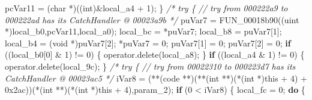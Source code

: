 \documentclass[
]{article}
\newenvironment{Shaded}{}{}
\newcommand{\BaseNTok}[1]{\textcolor[rgb]{0.25,0.63,0.44}{#1}}
\newcommand{\CommentTok}[1]{\textcolor[rgb]{0.38,0.63,0.69}{\textit{#1}}}
\newcommand{\ControlFlowTok}[1]{\textcolor[rgb]{0.00,0.44,0.13}{\textbf{#1}}}
\newcommand{\DataTypeTok}[1]{\textcolor[rgb]{0.56,0.13,0.00}{#1}}
\newcommand{\DecValTok}[1]{\textcolor[rgb]{0.25,0.63,0.44}{#1}}
\newcommand{\NormalTok}[1]{#1}
\newcommand{\OperatorTok}[1]{\textcolor[rgb]{0.40,0.40,0.40}{#1}}
\begin{document}
\begin{Shaded}
\begin{Highlighting}[]
\NormalTok{    pcVar11 }\OperatorTok{=} \OperatorTok{(}\DataTypeTok{char} \OperatorTok{*)((}\DataTypeTok{int}\OperatorTok{)\&}\NormalTok{local\_a4 }\OperatorTok{+} \DecValTok{1}\OperatorTok{);}
  \OperatorTok{\}}
                    \CommentTok{/* try \{ // try from 000222a9 to 000222ad has its CatchHandler @ 00023a9b */}
\NormalTok{  puVar7 }\OperatorTok{=}\NormalTok{ FUN\_00018b90}\OperatorTok{((}\NormalTok{uint }\OperatorTok{*)}\NormalTok{local\_b0}\OperatorTok{,}\NormalTok{pcVar11}\OperatorTok{,}\NormalTok{local\_a0}\OperatorTok{);}
\NormalTok{  local\_bc }\OperatorTok{=} \OperatorTok{*}\NormalTok{puVar7}\OperatorTok{;}
\NormalTok{  local\_b8 }\OperatorTok{=}\NormalTok{ puVar7}\OperatorTok{[}\DecValTok{1}\OperatorTok{];}
\NormalTok{  local\_b4 }\OperatorTok{=} \OperatorTok{(}\DataTypeTok{void} \OperatorTok{*)}\NormalTok{puVar7}\OperatorTok{[}\DecValTok{2}\OperatorTok{];}
  \OperatorTok{*}\NormalTok{puVar7 }\OperatorTok{=} \DecValTok{0}\OperatorTok{;}
\NormalTok{  puVar7}\OperatorTok{[}\DecValTok{1}\OperatorTok{]} \OperatorTok{=} \DecValTok{0}\OperatorTok{;}
\NormalTok{  puVar7}\OperatorTok{[}\DecValTok{2}\OperatorTok{]} \OperatorTok{=} \DecValTok{0}\OperatorTok{;}
  \ControlFlowTok{if} \OperatorTok{((}\NormalTok{local\_b0}\OperatorTok{[}\DecValTok{0}\OperatorTok{]} \OperatorTok{\&} \DecValTok{1}\OperatorTok{)} \OperatorTok{!=} \DecValTok{0}\OperatorTok{)} \OperatorTok{\{}
\NormalTok{    operator}\OperatorTok{.}\NormalTok{delete}\OperatorTok{(}\NormalTok{local\_a8}\OperatorTok{);}
  \OperatorTok{\}}
  \ControlFlowTok{if} \OperatorTok{((}\NormalTok{local\_a4 }\OperatorTok{\&} \DecValTok{1}\OperatorTok{)} \OperatorTok{!=} \DecValTok{0}\OperatorTok{)} \OperatorTok{\{}
\NormalTok{    operator}\OperatorTok{.}\NormalTok{delete}\OperatorTok{(}\NormalTok{local\_9c}\OperatorTok{);}
  \OperatorTok{\}}
                    \CommentTok{/* try \{ // try from 00022310 to 000223d7 has its CatchHandler @ 00023ac5 */}
\NormalTok{  iVar8 }\OperatorTok{=} \OperatorTok{(**(}\NormalTok{code }\OperatorTok{**)(**(}\DataTypeTok{int} \OperatorTok{**)(*(}\DataTypeTok{int} \OperatorTok{*)}\NormalTok{this }\OperatorTok{+} \DecValTok{4}\OperatorTok{)} \OperatorTok{+} \BaseNTok{0x2ac}\OperatorTok{))(*(}\DataTypeTok{int} \OperatorTok{**)(*(}\DataTypeTok{int} \OperatorTok{*)}\NormalTok{this }\OperatorTok{+} \DecValTok{4}\OperatorTok{),}\NormalTok{param\_2}\OperatorTok{);}
  \ControlFlowTok{if} \OperatorTok{(}\DecValTok{0} \OperatorTok{\textless{}}\NormalTok{ iVar8}\OperatorTok{)} \OperatorTok{\{}
\NormalTok{    local\_fc }\OperatorTok{=} \DecValTok{0}\OperatorTok{;}
    \ControlFlowTok{do} \OperatorTok{\{}

\end{Highlighting}
\end{Shaded}
\end{document}
